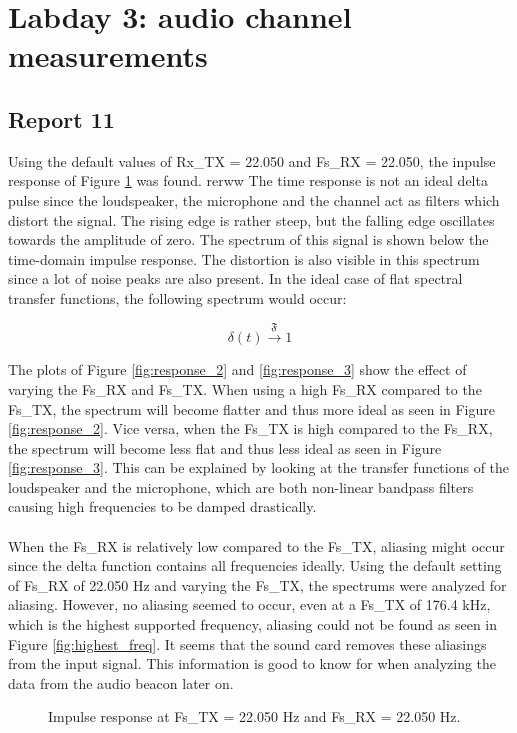 \documentclass[final]{scrreprt} %
\begin{document}
\section*{Labday 3: audio channel measurements}
\subsection*{Report 11}
Using the default values of Rx\_TX = 22.050 and Fs\_RX = 22.050, the inpulse response of Figure \ref{fig:response_1} was found. rerww
The time response is not an ideal delta pulse since the loudspeaker, the microphone and the channel act as filters which distort the signal.
The rising edge is rather steep, but the falling edge oscillates towards the amplitude of zero.
The spectrum of this signal is shown below the time-domain impulse response.
The distortion is also visible in this spectrum since a lot of noise peaks are also present.
In the ideal case of flat spectral transfer functions, the following spectrum would occur:

\begin{equation}
	\delta(t) \xrightarrow{\mathfrak{F}} 1
\end{equation}

The plots of Figure \ref{fig:response_2} and \ref{fig:response_3} show the effect of varying the Fs\_RX and Fs\_TX.
When using a high Fs\_RX compared to the Fs\_TX, the spectrum will become flatter and thus more ideal as seen in Figure \ref{fig:response_2}.
Vice versa, when the Fs\_TX is high compared to the Fs\_RX, the spectrum will become less flat and thus less ideal as seen in Figure \ref{fig:response_3}.
This can be explained by looking at the transfer functions of the loudspeaker and the microphone, which are both non-linear bandpass filters causing high frequencies to be damped drastically.
\\ \\
When the Fs\_RX is relatively low compared to the Fs\_TX, aliasing might occur since the delta function contains all frequencies ideally.
Using the default setting of Fs\_RX of 22.050 Hz and varying the Fs\_TX, the spectrums were analyzed for aliasing.
However, no aliasing seemed to occur, even at a Fs\_TX of 176.4 kHz, which is the highest supported frequency, aliasing could not be found as seen in Figure \ref{fig:highest_freq}.
It seems that the sound card removes these aliasings from the input signal.
This information is good to know for when analyzing the data from the audio beacon later on.

\begin{figure}[H]
	\centering
	\setlength\figureheight{4cm}
    	\setlength{}
	
	\caption{Impulse response at Fs\_TX = 22.050 Hz and Fs\_RX = 22.050 Hz.}
	\label{fig:response_1}
\end{figure}
\end{document}
